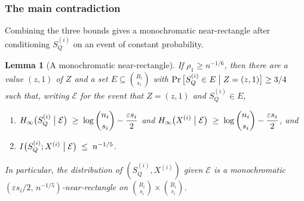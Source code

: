 \documentclass[11pt]{article}
\theoremstyle{plain}
\newtheorem{lemma}[theorem]{Lemma}
\theoremstyle{definition}
\theoremstyle{remark}
\newcommand{\eps}{\varepsilon}
\newcommand{\cE}{\mathcal{E}}
\newcommand{\Hmin}{H_\infty}
\begin{document}
\subsubsection{The main contradiction}

Combining the three bounds gives a monochromatic near-rectangle after conditioning $S_Q^{(i)}$ on an event of constant probability.

\begin{lemma}[A monochromatic near-rectangle]\label{lem:near-rect}
If $\rho_1 \ge n^{-1/6}$, then there are a value $(z, 1)$ of $Z$ and a set $E \subseteq \binom{B_i}{s_i}$ with $\Pr\big[S_Q^{(i)} \in E \bigm| Z = (z, 1)\big] \ge 3/4$ such that, writing $\cE$ for the event that $Z = (z, 1)$ and $S_Q^{(i)} \in E$,
\begin{enumerate}[label=(\roman*)]
  \item $\displaystyle \Hmin\big(S_Q^{(i)} \bigm| \cE\big) \;\ge\; \log\binom{n_i}{s_i} - \frac{\eps s_i}{2}$ \quad and \quad $\displaystyle \Hmin\big(X^{(i)} \bigm| \cE\big) \;\ge\; \log\binom{n_i}{s_i} - \frac{\eps s_i}{2}$, and
  \item $I\big(S_Q^{(i)}; X^{(i)} \bigm| \cE\big) \;\le\; n^{-1/5}$.
\end{enumerate}
In particular, the distribution of $(S_Q^{(i)}, X^{(i)})$ given $\cE$ is a monochromatic $(\eps s_i/2,\, n^{-1/5})$-near-rectangle on $\binom{B_i}{s_i} \times \binom{B_i}{s_i}$.
\end{lemma}
\end{document}
